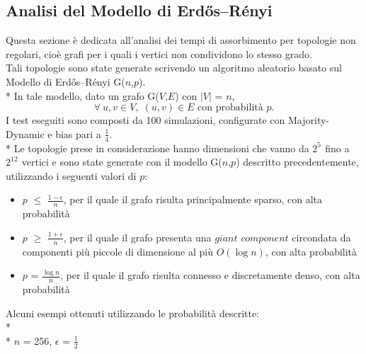 \documentclass{article}
\begin{document}
\subsection{Analisi del Modello di Erdős–Rényi}
Questa sezione è dedicata all'analisi dei tempi di assorbimento per topologie non regolari, cioè grafi per i quali i vertici non condividono lo stesso grado.\\
Tali topologie sono state generate scrivendo un algoritmo aleatorio basato sul Modello di Erdős–Rényi G($n$,$p$).\\*
In tale modello, dato un grafo G($V$,$E$) con $|V|$ = $n$,
\begin{equation}
    \forall \: u,v \in V,\; (u,v) \in E  \text{ con probabilità } p.
\end{equation}
I test eseguiti sono composti da 100 simulazioni, configurate con Majority-Dynamic e bias pari a $\frac{1}{4}$.\\*
Le topologie prese in considerazione hanno dimensioni che vanno da $2^{5^{\mathrm{}}}$ fino a $2^{12^{\mathrm{}}}$ vertici e sono state generate con il modello G($n$,$p$) descritto precedentemente, utilizzando i seguenti valori di $p$:
\begin{itemize}
\item $p$ $\leq$ $\frac{1-\epsilon}{n}$, per il quale il grafo risulta principalmente sparso, con alta probabilità
\item $p$ $\geq$ $\frac{1+\epsilon}{n}$, per il quale il grafo presenta una $giant$ $component$ circondata da componenti più piccole di dimensione al più $O(\log{}n)$, con alta probabilità
\item $p$ = $\frac{\log{}n}{n}$, per il quale il grafo risulta connesso e discretamente denso, con alta probabilità
\end{itemize}
Alcuni esempi ottenuti utilizzando le probabilità descritte:\\*
\\*
$n$ = 256, $\epsilon$ = $\frac{1}{2}$
\end{document}
